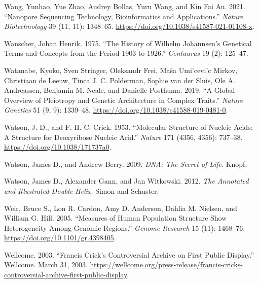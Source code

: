 \documentclass[
]{book}
\newlength{\cslhangindent}
\newlength{\cslentryspacingunit} %
\newenvironment{CSLReferences}[2] %
 {%
  \setlength{\parindent}{0pt}
  \ifodd #1
  \let\oldpar\par
  \def\par{\hangindent=\cslhangindent\oldpar}
  \fi
  \setlength{\parskip}{#2\cslentryspacingunit}
 }%
 {}
\begin{document}
\begin{CSLReferences}{1}{0}
\leavevmode{}%
Wang, Yunhao, Yue Zhao, Audrey Bollas, Yuru Wang, and Kin Fai Au. 2021. {``Nanopore Sequencing Technology, Bioinformatics and Applications.''} \emph{Nature Biotechnology} 39 (11, 11): 1348--65. \url{https://doi.org/10.1038/s41587-021-01108-x}.

\leavevmode{}%
Wanscher, Johan Henrik. 1975. {``The History of {Wilhelm Johannsen}'s Genetical Terms and Concepts from the Period 1903 to 1926.''} \emph{Centaurus} 19 (2): 125--47.

\leavevmode{}%
Watanabe, Kyoko, Sven Stringer, Oleksandr Frei, Maša Umi'cevi'c Mirkov, Christiaan de Leeuw, Tinca J. C. Polderman, Sophie van der Sluis, Ole A. Andreassen, Benjamin M. Neale, and Danielle Posthuma. 2019. {``A Global Overview of Pleiotropy and Genetic Architecture in Complex Traits.''} \emph{Nature Genetics} 51 (9, 9): 1339--48. \url{https://doi.org/10.1038/s41588-019-0481-0}.

\leavevmode{}%
Watson, J. D., and F. H. C. Crick. 1953. {``Molecular {Structure} of {Nucleic Acids}: {A Structure} for {Deoxyribose Nucleic Acid}.''} \emph{Nature} 171 (4356, 4356): 737--38. \url{https://doi.org/10.1038/171737a0}.

\leavevmode{}%
Watson, James D., and Andrew Berry. 2009. \emph{{DNA}: {The} Secret of Life}. {Knopf}.

\leavevmode{}%
Watson, James D., Alexander Gann, and Jan Witkowski. 2012. \emph{The Annotated and Illustrated Double Helix}. {Simon and Schuster}.

\leavevmode{}%
Weir, Bruce S., Lon R. Cardon, Amy D. Anderson, Dahlia M. Nielsen, and William G. Hill. 2005. {``Measures of Human Population Structure Show Heterogeneity Among Genomic Regions.''} \emph{Genome Research} 15 (11): 1468--76. \url{https://doi.org/10.1101/gr.4398405}.

\leavevmode{}%
Wellcome. 2003. {``Francis {Crick}'s Controversial Archive on First Public Display.''} {Wellcome}. March 31, 2003. \url{https://wellcome.org/press-release/francis-cricks-controversial-archive-first-public-display}.


\end{CSLReferences}
\end{document}

